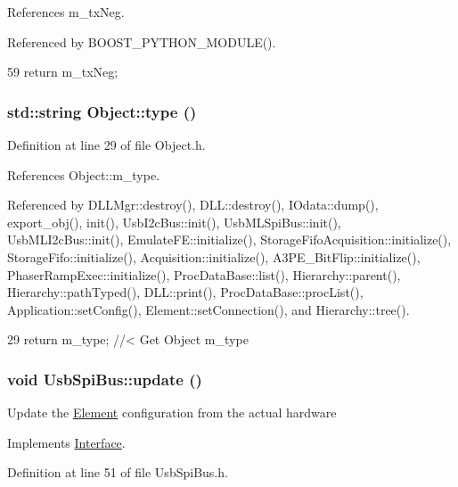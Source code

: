 References m\_\-txNeg.

Referenced by BOOST\_\-PYTHON\_\-MODULE().


\begin{DoxyCode}
59 { return m_txNeg; }
\end{DoxyCode}
\hypertarget{classObject_a84f99f70f144a83e1582d1d0f84e4e62}{
\subsubsection[{type}]{\setlength{\rightskip}{0pt plus 5cm}std::string Object::type ()}}
\label{classObject_a84f99f70f144a83e1582d1d0f84e4e62}


Definition at line 29 of file Object.h.

References Object::m\_\-type.

Referenced by DLLMgr::destroy(), DLL::destroy(), IOdata::dump(), export\_\-obj(), init(), UsbI2cBus::init(), UsbMLSpiBus::init(), UsbMLI2cBus::init(), EmulateFE::initialize(), StorageFifoAcquisition::initialize(), StorageFifo::initialize(), Acquisition::initialize(), A3PE\_\-BitFlip::initialize(), PhaserRampExec::initialize(), ProcDataBase::list(), Hierarchy::parent(), Hierarchy::pathTyped(), DLL::print(), ProcDataBase::procList(), Application::setConfig(), Element::setConnection(), and Hierarchy::tree().


\begin{DoxyCode}
29 { return m_type;       } //< Get Object m_type
\end{DoxyCode}
\hypertarget{classUsbSpiBus_a3e26195827351bf88db56dafd1e7de26}{
\subsubsection[{update}]{\setlength{\rightskip}{0pt plus 5cm}void UsbSpiBus::update ()}}
\label{classUsbSpiBus_a3e26195827351bf88db56dafd1e7de26}
Update the \hyperlink{classElement}{Element} configuration from the actual hardware 

Implements \hyperlink{classInterface_a30e71ffbe36091df9f7c0838dd4b60d2}{Interface}.

Definition at line 51 of file UsbSpiBus.h.

